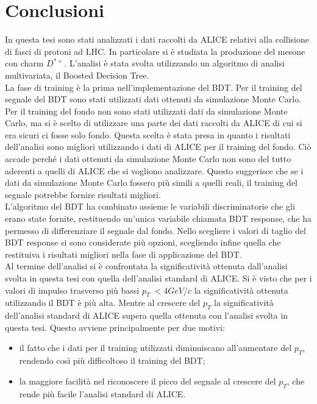 \chapter{Conclusioni}

In questa tesi sono stati analizzati i dati raccolti da ALICE relativi alla collisione di fasci di protoni ad LHC. In particolare si è studiata la produzione del mesone con charm $D^{*+}$. L'analisi è stata svolta utilizzando un algoritmo di analisi multivariata, il Boosted Decision Tree.
\\La fase di training è la prima nell'implementazione del BDT. Per il training del segnale del BDT sono stati utilizzati dati ottenuti da simulazione Monte Carlo. Per il training del fondo non sono stati utilizzati dati da simulazione Monte Carlo, ma si è scelto di utilizzare una parte dei dati raccolti da ALICE di cui si era sicuri ci fosse solo fondo. Questa scelta è stata presa in quanto i risultati dell'analisi sono migliori utilizzando i dati di ALICE per il training del fondo. Ciò accade perché i dati ottenuti da simulazione Monte Carlo non sono del tutto aderenti a quelli di ALICE che si vogliono analizzare. Questo suggerisce che se i dati da simulazione Monte Carlo fossero più simili a quelli reali, il training del segnale potrebbe fornire risultati migliori. 
\\L'algoritmo del BDT ha combinato assieme le variabili discriminatorie che gli erano state fornite, restituendo un'unica variabile chiamata BDT response, che ha permesso di differenziare il segnale dal fondo. Nello scegliere i valori di taglio del BDT response si sono considerate più opzioni, scegliendo infine quella che restituiva i risultati migliori nella fase di applicazione del BDT.
\\Al termine dell'analisi si è confrontata la significatività ottenuta dall'analisi svolta in questa tesi con quella dell'analisi standard di ALICE. Si è visto che per i valori di impulso trasverso più bassi $p_T \ < 4 GeV/c$ la significatività ottenuta utilizzando il BDT è più alta. Mentre al crescere del $p_T$ la significatività dell'analisi standard di ALICE supera quella ottenuta con l'analisi svolta in questa tesi. Questo avviene principalmente per due motivi:
    \begin{itemize}
        \item il fatto che i dati per il training utilizzati diminuiscano all'aumentare del $p_T$, rendendo così più difficoltoso il training del BDT;
        \item la maggiore facilità nel riconoscere il picco del segnale al crescere del $p_T$, che rende più facile l'analisi standard di ALICE.
    \end{itemize}
    
